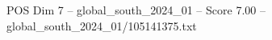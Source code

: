 \begin{textsample}{POS Dim 7 – global\_south\_2024\_01 – Score 7.00 – global\_south\_2024\_01/105141375.txt}
\end{textsample}
